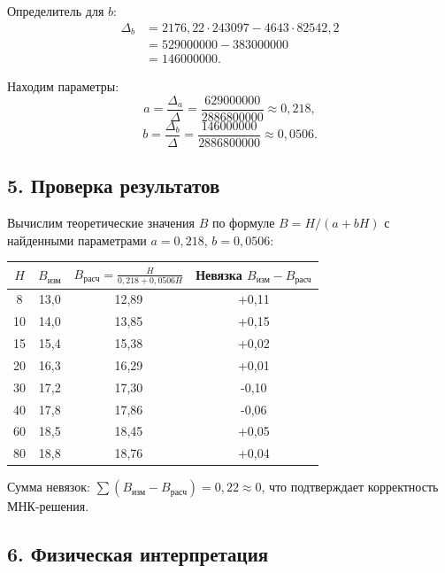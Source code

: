 \documentclass{article}
\begin{document}
Определитель для $b$:
\begin{align}
\Delta_b &= 2176{,}22 \cdot 243097 - 4643 \cdot 82542{,}2 \nonumber \\
&= 529000000 - 383000000 \nonumber \\
&= 146000000.
\end{align}

Находим параметры:
\begin{equation}
a = \frac{\Delta_a}{\Delta} = \frac{629000000}{2886800000} \approx 0{,}218,
\end{equation}
\begin{equation}
b = \frac{\Delta_b}{\Delta} = \frac{146000000}{2886800000} \approx 0{,}0506.
\end{equation}

\subsection*{5. Проверка результатов}

Вычислим теоретические значения $B$ по формуле $B = H/(a + bH)$ с найденными параметрами $a = 0{,}218$, $b = 0{,}0506$:

\begin{center}
\begin{tabular}{|c|c|c|c|}
\hline
$H$ & $B_{\text{изм}}$ & $B_{\text{расч}} = \frac{H}{0{,}218 + 0{,}0506H}$ & Невязка $B_{\text{изм}} - B_{\text{расч}}$ \\
\hline
8 & 13,0 & 12,89 & +0,11 \\
10 & 14,0 & 13,85 & +0,15 \\
15 & 15,4 & 15,38 & +0,02 \\
20 & 16,3 & 16,29 & +0,01 \\
30 & 17,2 & 17,30 & -0,10 \\
40 & 17,8 & 17,86 & -0,06 \\
60 & 18,5 & 18,45 & +0,05 \\
80 & 18,8 & 18,76 & +0,04 \\
\hline
\end{tabular}
\end{center}

Сумма невязок: $\sum (B_{\text{изм}} - B_{\text{расч}}) = 0{,}22 \approx 0$, что подтверждает корректность МНК-решения.

\subsection*{6. Физическая интерпретация}
\end{document}
